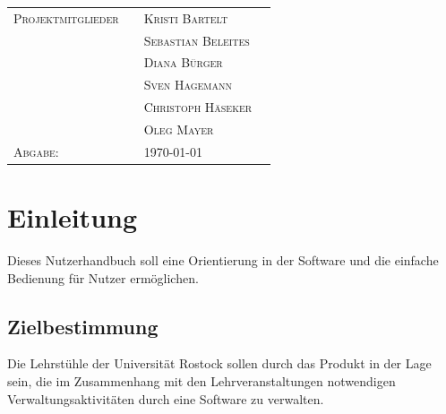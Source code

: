 \documentclass{Handbuch}
\begin{document}
\parindent 0pt

\begin{titlepage}


\vspace*{6cm}


\vspace{1cm}

\begin{table}[h]
\onehalfspacing
\begin{tabular}{p{5cm}|p{0.1cm} p{10cm}l}
\textsc{Projektmitglieder} & & \textsc{Kristi Bartelt}\\
\textsc{} & & \textsc{Sebastian Beleites}\\
\textsc{} & & \textsc{Diana Bürger}\\
\textsc{} & & \textsc{Sven Hagemann}\\
\textsc{} & & \textsc{Christoph Häseker}\\
\textsc{} & & \textsc{Oleg Mayer}\\
\textsc{Abgabe:} & & \textsc{\today}\\
\end{tabular}
\end{table}
\end{titlepage}

\restoregeometry


\tableofcontents %

\newpage %



\section{Einleitung}
Dieses Nutzerhandbuch soll eine Orientierung in der Software und die einfache Bedienung für Nutzer ermöglichen.

\subsection{Zielbestimmung}
Die Lehrstühle der Universität Rostock sollen durch das Produkt in der Lage sein, die im Zusammenhang mit den Lehrveranstaltungen notwendigen Verwaltungsaktivitäten durch eine Software zu verwalten.
\end{document}
